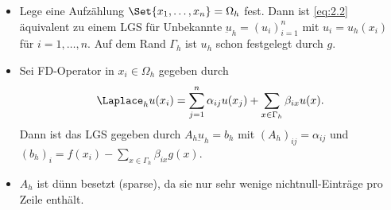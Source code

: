\begin{nt*}
	\begin{itemize}
		\item
			Lege eine Aufzählung $\Set{x_1, \dotsc, x_n} = \Omega_h$ fest.
			Dann ist \eqref{eq:2.2} äquivalent zu einem LGS für Unbekannte $\underbar{u}_h = (u_i)_{i=1}^n$ mit $u_i = u_h(x_i)$ für $i=1,\dotsc, n$.
			Auf dem Rand $\Gamma_h$ ist $u_h$ schon festgelegt durch $g$.
		\item
			Sei FD-Operator in $x_i \in \Omega_h$ gegeben durch
			\[
				\Laplace_h u(x_i) = \sum_{j=1}^n \alpha_{ij} u(x_j) + \sum_{x\in \Gamma_h} \beta_{ix} u(x).
			\]
			Dann ist das LGS gegeben durch $A_h \underbar{u}_h = b_h$ mit $(A_h)_{ij} = \alpha_{ij}$ und $(b_h)_i = f(x_i) - \sum_{x\in \Gamma_h} \beta_{ix} g(x)$.
		\item
			$A_h$ ist dünn besetzt (sparse), da sie nur sehr wenige nichtnull-Einträge pro Zeile enthält.
	\end{itemize}
\end{nt*}


